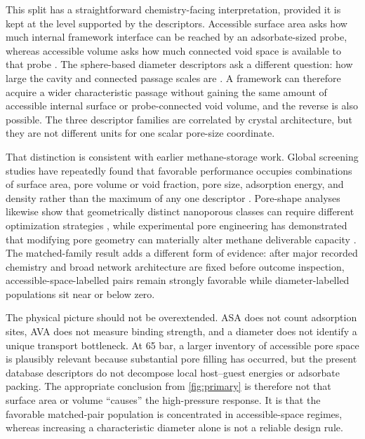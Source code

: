 \documentclass[11pt,a4paper]{article}
\begin{document}
This split has a straightforward chemistry-facing interpretation, provided it is
kept at the level supported by the descriptors. Accessible surface area asks how
much internal framework interface can be reached by an adsorbate-sized probe,
whereas accessible volume asks how much connected void space is available to that
probe \cite{duren2007surface,walton2007bet}. The sphere-based diameter descriptors
ask a different question: how large the cavity and connected passage scales are
\cite{willems2012zeopp}. A framework can therefore acquire a wider characteristic
passage without gaining the same amount of accessible internal surface or
probe-connected void volume, and the reverse is also possible. The three
descriptor families are correlated by crystal architecture, but they are not
different units for one scalar pore-size coordinate.

That distinction is consistent with earlier methane-storage work. Global screening
studies have repeatedly found that favorable performance occupies combinations of
surface area, pore volume or void fraction, pore size, adsorption energy, and
density rather than the maximum of any one descriptor
\cite{wilmer2012screening,fernandez2013qspr,gomezgualdron2014limits,
getman2012simreview}. Pore-shape analyses likewise show that geometrically distinct
nanoporous classes can require different optimization strategies
\cite{lee2017poregeometry}, while experimental pore engineering has demonstrated
that modifying pore geometry can materially alter methane deliverable capacity
\cite{liang2017poregeometry}. The matched-family result adds a different form of
evidence: after major recorded chemistry and broad network architecture are fixed
before outcome inspection, accessible-space-labelled pairs remain strongly
favorable while diameter-labelled populations sit near or below zero.

The physical picture should not be overextended. ASA does not count adsorption
sites, AVA does not measure binding strength, and a diameter does not identify a
unique transport bottleneck. At 65 bar, a larger inventory of accessible pore
space is plausibly relevant because substantial pore filling has occurred, but the
present database descriptors do not decompose local host--guest energies or
adsorbate packing. The appropriate conclusion from \cref{fig:primary} is therefore
not that surface area or volume ``causes'' the high-pressure response. It is that
the favorable matched-pair population is concentrated in accessible-space regimes,
whereas increasing a characteristic diameter alone is not a reliable design rule.
\end{document}
